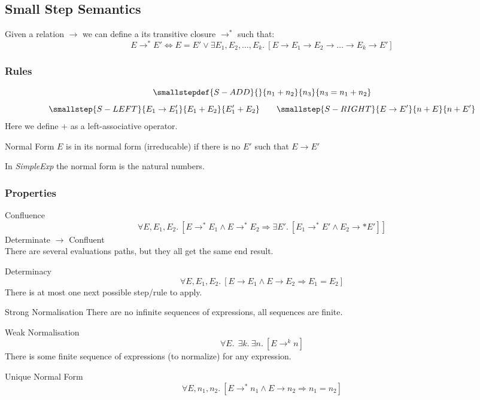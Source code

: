 \subsection{Small Step Semantics}
Given a relation $\to$ we can define a its transitive closure $\to^*$ such that:
\[E \to^* E' \Leftrightarrow E = E' \lor \exists E_1, E_2, \dots, E_k . \ [E \to E_1 \to E_2 \to \dots \to E_k \to E'] \]

\subsubsection{Rules}
\[\smallstepdef{S-ADD}{}{n_1 + n_2}{n_3}{n_3 = n_1 + n_2}\]
\[\smallstep{S-LEFT}{E_1 \to E_1'}{E_1 + E_2}{E_1' + E_2} \qquad \smallstep{S-RIGHT}{E \to E'}{n + E}{n + E'}\]
Here we define $+$ as a left-associative operator.
\begin{definitionbox}{Normal Form}
    $E$ is in its normal form (irreducable) if there is no $E'$ such that $E \to E'$        
\end{definitionbox}
\noindent In \textit{SimpleExp} the normal form is the natural numbers.

\subsubsection{Properties}
\begin{definitionbox}{Confluence}
    \[\forall E, E_1, E_2 . \ [E \to^* E_1 \land E \to^* E_2 \Rightarrow \exists E' . \ [E_1 \to^* E' \land E_2 \to* E']]\]
    Determinate $\rightarrow$ Confluent
    \\ There are several evaluations paths, but they all get the same end result.
\end{definitionbox}
\begin{tcbraster}[raster columns=2,raster equal height]
    \begin{definitionbox}{Determinacy}
        \[\forall E, E_1, E_2 . \ [E \to E_1 \land E \to E_2 \Rightarrow E_1 = E_2]\]
        There is at most one next possible step/rule to apply.
    \end{definitionbox}
    \begin{definitionbox}{Strong Normalisation}
        There are no infinite sequences of expressions, all sequences are finite.
    \end{definitionbox}

    \begin{definitionbox}{Weak Normalisation}
        \[\forall E. \ \ \exists k. \ \exists n. \ [E \to^k n]\]
        There is some finite sequence of expressions (to normalize) for any expression.
    \end{definitionbox}
    \begin{definitionbox}{Unique Normal Form}
        \[\forall E, n_1, n_2. \ [E \to^* n_1 \land E \to n_2 \Rightarrow n_1 = n_2]\]
    \end{definitionbox}
\end{tcbraster}	

